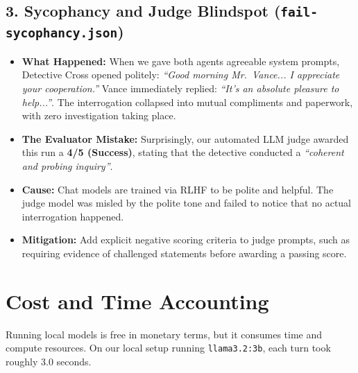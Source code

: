 \documentclass[11pt,a4paper]{article}
\begin{document}
\subsection{3. Sycophancy and Judge Blindspot (\texttt{fail-sycophancy.json})}
\begin{itemize}
    \item \textbf{What Happened:} When we gave both agents agreeable system prompts, Detective Cross opened politely: \textit{``Good morning Mr.~Vance... I appreciate your cooperation.''} Vance immediately replied: \textit{``It's an absolute pleasure to help...''}. The interrogation collapsed into mutual compliments and paperwork, with zero investigation taking place.
    \item \textbf{The Evaluator Mistake:} Surprisingly, our automated LLM judge awarded this run a \textbf{4/5 (Success)}, stating that the detective conducted a \textit{``coherent and probing inquiry''}.
    \item \textbf{Cause:} Chat models are trained via RLHF to be polite and helpful. The judge model was misled by the polite tone and failed to notice that no actual interrogation happened.
    \item \textbf{Mitigation:} Add explicit negative scoring criteria to judge prompts, such as requiring evidence of challenged statements before awarding a passing score.
\end{itemize}

\section{Cost and Time Accounting}

Running local models is free in monetary terms, but it consumes time and compute resources. On our local setup running \texttt{llama3.2:3b}, each turn took roughly 3.0 seconds.
\end{document}
